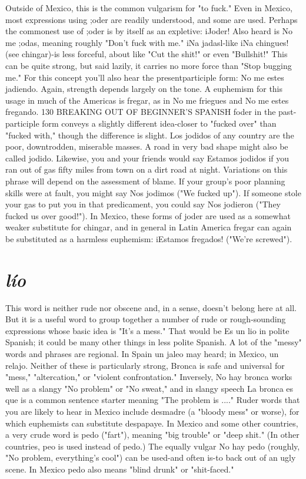 \documentclass[14pt,a4paper,oneside]{memoir}
\begin{document}
Outside of Mexico, this is the common vulgarism for "to
fuck." Even in Mexico, most expressions using ;oder are readily understood, and some are used. Perhaps the commonest use of ;oder is by
itself as an expletive: iJoder! Also heard is No me ;odas, meaning
roughly "Don't fuck with me." iNa jadasl-like iNa chingues! (see
chingar)-is less forceful, about like "Cut the shit!" or even "Bullshit!" This can be quite strong, but said lazily, it carries no more force
than "Stop bugging me." For this concept you'll also hear the presentparticiple form: No me estes jadiendo. Again, strength depends largely
on the tone. A euphemism for this usage in much of the Americas is
fregar, as in No me friegues and No me estes fregando.
130 BREAKING OUT OF BEGINNER'S SPANISH
foder in the past-participle form conveys a slightly different
idea-closer to "fucked over" than "fucked with," though the difference is slight. Los jodidos of any country are the poor, downtrodden,
miserable masses. A road in very bad shape might also be called jodido. Likewise, you and your friends would say Estamos jodidos if you
ran out of gas fifty miles from town on a dirt road at night. Variations
on this phrase will depend on the assessment of blame. If your group's
poor planning skills were at fault, you might say Nos jodimos ("We
fucked up"). If someone stole your gas to put you in that predicament,
you could say Nos jodieron ("They fucked us over good!"). In Mexico,
these forms of joder are used as a somewhat weaker substitute for
chingar, and in general in Latin America fregar can again be substituted as a harmless euphemism: iEstamos fregados! ("We're screwed").

\section{\emph{lío}}

This word is neither rude nor obscene and, in a sense, doesn't
belong here at all. But it is a useful word to group together a number of
rude or rough-sounding expressions whose basic idea is "It's a mess."
That would be Es un lio in polite Spanish; it could be many other
things in less polite Spanish.
A lot of the "messy" words and phrases are regional. In Spain
un jaleo may heard; in Mexico, un relajo. Neither of these is particularly strong, Bronca is safe and universal for "mess," "altercation,"
or "violent confrontation." Inversely, No hay bronca works well as a
slangy "No problem" or "No sweat," and in slangy speech La bronca
es que is a common sentence starter meaning "The problem is ...."
Ruder words that you are likely to hear in Mexico include desmadre (a "bloody mess" or worse), for which euphemists can substitute despapaye. In Mexico and some other countries, a very crude
word is pedo ("fart"), meaning "big trouble" or "deep shit." (In other
countries, peo is used instead of pedo.) The equally vulgar No hay
pedo (roughly, "No problem, everything's cool") can be used-and
often is-to back out of an ugly scene. In Mexico pedo also means
"blind drunk" or "shit-faced."
\end{document}
